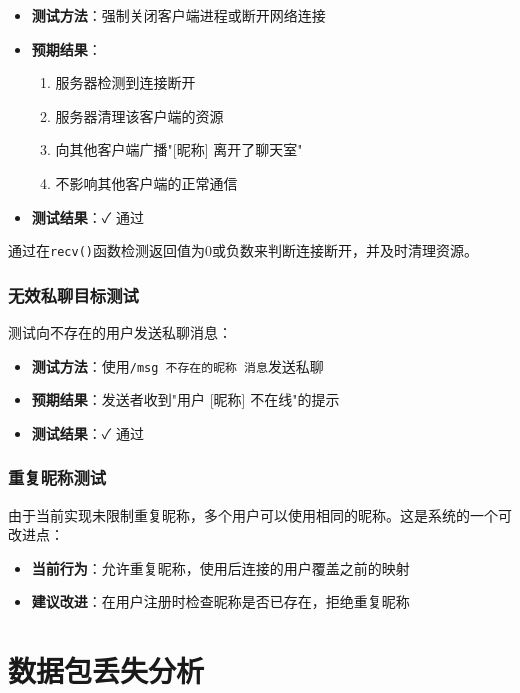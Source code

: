 \documentclass[12pt, a4paper]{article}
\newcommand{\cmd}[1]{\texttt{#1}}
\begin{document}
\begin{itemize}[itemsep=3pt]
  \item \textbf{测试方法}：强制关闭客户端进程或断开网络连接
  \item \textbf{预期结果}：
  \begin{enumerate}[itemsep=2pt]
    \item 服务器检测到连接断开
    \item 服务器清理该客户端的资源
    \item 向其他客户端广播"[昵称] 离开了聊天室"
    \item 不影响其他客户端的正常通信
  \end{enumerate}
  \item \textbf{测试结果}：✓ 通过
\end{itemize}

通过在\cmd{recv()}函数检测返回值为0或负数来判断连接断开，并及时清理资源。

\subsubsection{无效私聊目标测试}

测试向不存在的用户发送私聊消息：

\begin{itemize}[itemsep=3pt]
  \item \textbf{测试方法}：使用\cmd{/msg 不存在的昵称 消息}发送私聊
  \item \textbf{预期结果}：发送者收到"用户 [昵称] 不在线"的提示
  \item \textbf{测试结果}：✓ 通过
\end{itemize}

\subsubsection{重复昵称测试}

由于当前实现未限制重复昵称，多个用户可以使用相同的昵称。这是系统的一个可改进点：

\begin{itemize}[itemsep=3pt]
  \item \textbf{当前行为}：允许重复昵称，使用后连接的用户覆盖之前的映射
  \item \textbf{建议改进}：在用户注册时检查昵称是否已存在，拒绝重复昵称
\end{itemize}

\section{数据包丢失分析}
\end{document}
